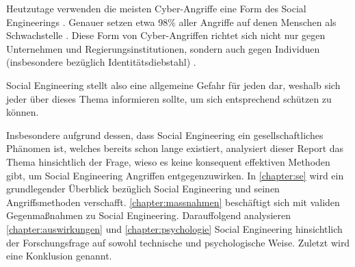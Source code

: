 Heutzutage verwenden die meisten Cyber-Angriffe eine Form des Social Engineerings .
Genauer setzen etwa 98\% aller Angriffe auf denen Menschen als Schwachstelle .
Diese Form von Cyber-Angriffen richtet sich nicht nur gegen Unternehmen und Regierungsinstitutionen,
sondern auch gegen Individuen (insbesondere bezüglich Identitätsdiebstahl) .

Social Engineering stellt also eine allgemeine Gefahr für jeden dar, weshalb sich jeder über dieses
Thema informieren sollte, um sich entsprechend schützen zu können.

Insbesondere aufgrund dessen, dass Social Engineering ein gesellschaftliches Phänomen ist, welches bereits
schon lange existiert, analysiert dieser Report das Thema hinsichtlich der Frage, wieso es keine konsequent effektiven
Methoden gibt, um Social Engineering Angriffen entgegenzuwirken.
In \autoref{chapter:se} wird ein grundlegender Überblick bezüglich Social Engineering und seinen Angriffsmethoden verschafft.
\autoref{chapter:massnahmen} beschäftigt sich mit validen Gegenmaßnahmen zu Social Engineering.
Darauffolgend analysieren \autoref{chapter:auswirkungen} und \autoref{chapter:psychologie} Social Engineering hinsichtlich der
Forschungsfrage auf sowohl technische und psychologische Weise. Zuletzt wird eine Konklusion genannt.
